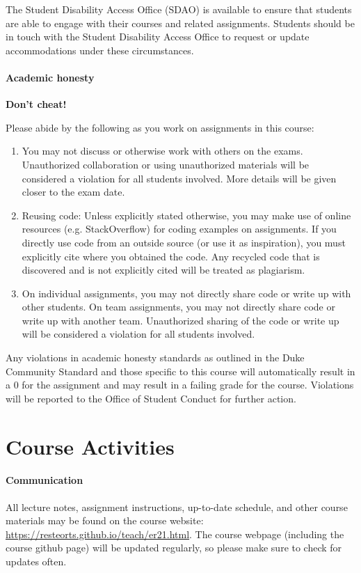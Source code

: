 \documentclass[11pt]{article}
\begin{document}
The Student Disability Access Office (SDAO) is available to ensure that students are able to engage with their courses and related assignments. Students should be in touch with the Student Disability Access Office to request or update accommodations under these circumstances.

\paragraph{Academic honesty}

\textbf{Don’t cheat!}

Please abide by the following as you work on assignments in this course:

\begin{enumerate}
\item You may not discuss or otherwise work with others on the exams. Unauthorized collaboration or using unauthorized materials will be considered a violation for all students involved. More details will be given closer to the exam date.
\item Reusing code: Unless explicitly stated otherwise, you may make use of online resources (e.g. StackOverflow) for coding examples on assignments. If you directly use code from an outside source (or use it as inspiration), you must explicitly cite where you obtained the code. Any recycled code that is discovered and is not explicitly cited will be treated as plagiarism.
\item On individual assignments, you may not directly share code or write up with other students. On team assignments, you may not directly share code or write up with another team. Unauthorized sharing of the code or write up will be considered a violation for all students involved.
\end{enumerate}

Any violations in academic honesty standards as outlined in the Duke Community Standard and those specific to this course will automatically result in a 0 for the assignment and may result in a failing grade for the course. Violations will be reported to the Office of Student Conduct for further action.


\newpage

\section{Course Activities}

\paragraph{Communication}
All lecture notes, assignment instructions, up-to-date schedule, and other course materials may be found on the course website: \url{https://resteorts.github.io/teach/er21.html}. The course webpage (including the course github page) will be updated regularly, so please make sure to check for updates often. \\
\end{document}
